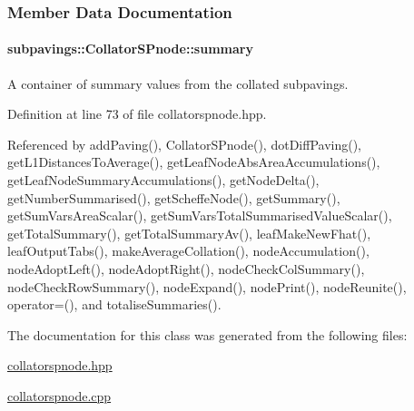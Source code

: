 \subsubsection{\-Member \-Data \-Documentation}
\hypertarget{classsubpavings_1_1CollatorSPnode_abecd2f87f50d84f2c3d04e6b0b15a5ec}{
\paragraph[{summary}]{ {\bf subpavings\-::\-Collator\-S\-Pnode\-::summary}}}\label{classsubpavings_1_1CollatorSPnode_abecd2f87f50d84f2c3d04e6b0b15a5ec}


\-A container of summary values from the collated subpavings. 



\-Definition at line 73 of file collatorspnode.\-hpp.



\-Referenced by add\-Paving(), \-Collator\-S\-Pnode(), dot\-Diff\-Paving(), get\-L1\-Distances\-To\-Average(), get\-Leaf\-Node\-Abs\-Area\-Accumulations(), get\-Leaf\-Node\-Summary\-Accumulations(), get\-Node\-Delta(), get\-Number\-Summarised(), get\-Scheffe\-Node(), get\-Summary(), get\-Sum\-Vars\-Area\-Scalar(), get\-Sum\-Vars\-Total\-Summarised\-Value\-Scalar(), get\-Total\-Summary(), get\-Total\-Summary\-Av(), leaf\-Make\-New\-Fhat(), leaf\-Output\-Tabs(), make\-Average\-Collation(), node\-Accumulation(), node\-Adopt\-Left(), node\-Adopt\-Right(), node\-Check\-Col\-Summary(), node\-Check\-Row\-Summary(), node\-Expand(), node\-Print(), node\-Reunite(), operator=(), and totalise\-Summaries().



\-The documentation for this class was generated from the following files\-:\begin{DoxyCompactItemize}
\item 
\hyperlink{collatorspnode_8hpp}{collatorspnode.\-hpp}\item 
\hyperlink{collatorspnode_8cpp}{collatorspnode.\-cpp}\end{DoxyCompactItemize}
